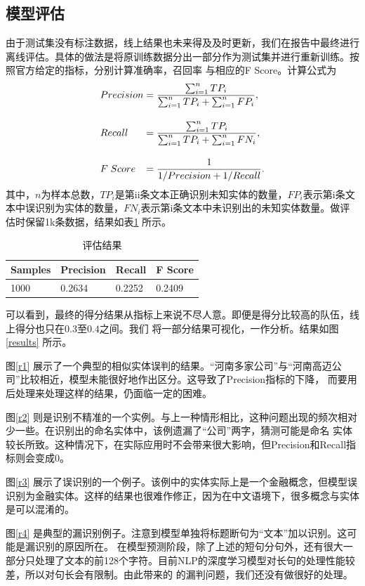 \documentclass[11pt]{article}
\begin{document}
\subsection{模型评估}
由于测试集没有标注数据，线上结果也未来得及及时更新，我们在报告中最终进行离线评估。具体的做法是将原训练数据分出一部分作为测试集并进行重新训练。按照官方给定的指标，分别计算准确率，召回率%
与相应的F Score。计算公式为
\begin{equation*}
    \begin{array}{l @{\; = \;} l}
        Precision & \displaystyle \frac{\sum_{i=1}^n TP_i}{\sum_{i=1}^nTP_i + \sum_{i=1}^nFP_{i}}, \\[20pt]
        Recall & \displaystyle \frac{\sum_{i=1}^n TP_i}{\sum_{i=1}^nTP_i + \sum_{i=1}^nFN_{i}}, \\[20pt]
        F \; Score & \displaystyle \frac{1}{1/Precision + 1/Recall}.
    \end{array}
\end{equation*}
其中，$n$为样本总数，$TP_i$是第ii条文本正确识别未知实体的数量，$FP_i$表示第i条文本中误识别为实体的数量，$FN_i$表示第i条文本中未识别出的未知实体数量。做评估时保留1k条数据，结果如表\ref{result} 所示。

\tabcolsep=20pt
\begin{table}[!ht]
    \centering
    \begin{tabular}{l l l l}
        \toprule
        Samples & Precision & Recall & F Score \\ \midrule
        1000    & 0.2634    & 0.2252    &  0.2409\\
        \bottomrule
    \end{tabular}
    \caption{评估结果}
    \label{result}
\end{table}

可以看到，最终的得分结果从指标上来说不尽人意。即便是得分比较高的队伍，线上得分也只在$0.3$至$0.4$之间。我们%
将一部分结果可视化，一作分析。结果如图\ref{results} 所示。\par
图\ref{r1} 展示了一个典型的相似实体误判的结果。“河南多家公司”与“河南高迈公司”比较相近，模型未能很好地作出区分。这导致了Precision指标的下降，%
而要用后处理来处理这样的结果，仍面临一定的困难。\par
图\ref{r2} 则是识别不精准的一个实例。与上一种情形相比，这种问题出现的频次相对少一些。在识别出的命名实体中，该例遗漏了“公司”两字，猜测可能是命名%
实体较长所致。这种情况下，在实际应用时不会带来很大影响，但Precision和Recall指标则会变成0。\par
图\ref{r3} 展示了误识别的一个例子。该例中的实体实际上是一个金融概念，但模型误识别为金融实体。这样的结果也很难作修正，因为在中文语境下，很多概念与实体是可以混淆的。\par%
图\ref{r4} 是典型的漏识别例子。注意到模型单独将标题断句为“文本”加以识别。这可能是漏识别的原因所在。
在模型预测阶段，除了上述的短句分句外，还有很大一部分只处理了文本的前128个字符。目前NLP的深度学习模型对长句的处理性能较差，所以对句长会有限制。由此带来的%
的漏判问题，我们还没有做很好的处理。
\end{document}
